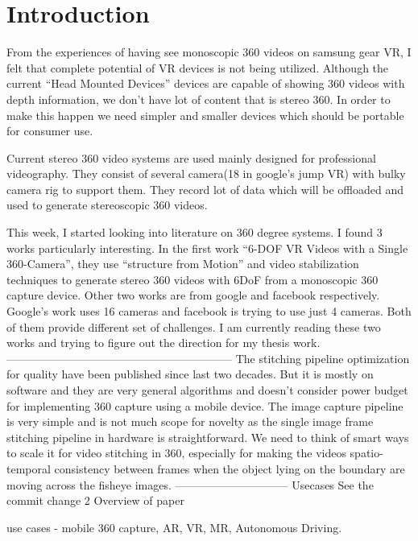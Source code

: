 \chapter{Introduction}

From the experiences of having see monoscopic 360 videos on samsung gear VR, I felt that complete potential of VR devices is not being utilized. Although the current “Head Mounted Devices” devices are capable of showing 360 videos with depth information, we don’t have lot of content that is stereo 360. In order to make this happen we need simpler and smaller devices which should be portable for consumer use.

Current stereo 360 video systems are used mainly designed for professional videography. They consist of several camera(18 in google’s jump VR) with bulky camera rig to support them. They record lot of data which will be offloaded and used to generate stereoscopic 360 videos. 

This week, I started looking into literature on 360 degree systems. I found 3 works particularly interesting. In the first work “6-DOF VR Videos with a Single 360-Camera”, they use “structure from Motion” and video stabilization techniques to generate stereo 360 videos with 6DoF  from a monoscopic 360 capture device.  Other two works are from google and facebook respectively. Google’s work uses 16 cameras and facebook is trying to use just 4 cameras. Both of them provide different set of challenges. I am currently reading these two works and trying to figure out the direction for my thesis work. 
------------------------------------------------------------
The stitching pipeline optimization for quality have been published since last two decades. But  it is mostly on software and they are very general algorithms and doesn’t consider power budget for implementing 360 capture using a mobile device. The image capture pipeline is very simple and is not much scope for novelty as the single image frame stitching pipeline in hardware is straightforward. We need to think of smart ways to scale it for video stitching in 360, especially for making the videos spatio-temporal consistency between frames when the object lying on the boundary are moving across the fisheye images. 
------------------------------
Usecases \newline
See the commit change 2
Overview of paper \newline

use cases - mobile 360 capture, AR, VR, MR, Autonomous Driving. \newline

